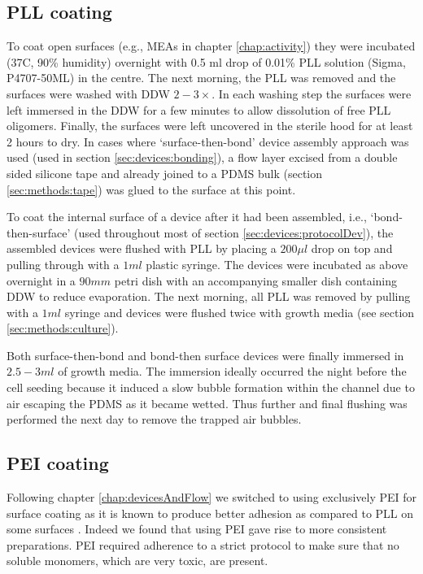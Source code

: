         \subsection{PLL coating}
        To coat open surfaces (e.g., MEAs in chapter \ref{chap:activity}) they were incubated (37\degree C, 90\% humidity) overnight with 0.5 ml drop of 0.01\% PLL solution (Sigma, P4707-50ML) in the centre. The next morning, the PLL was removed and the surfaces were washed with DDW \(2-3\times\). In each washing step the surfaces were left immersed in the DDW for a few minutes to allow dissolution of free PLL oligomers. Finally, the surfaces were left uncovered in the sterile hood for at least 2 hours to dry. In cases where `surface-then-bond' device assembly approach was used (used in section \ref{sec:devices:bonding}), a flow layer excised from a double sided silicone tape and already joined to a PDMS bulk (section \ref{sec:methods:tape}) was glued to the surface at this point.

        To coat the internal surface of a device after it had been assembled, i.e., `bond-then-surface' (used throughout most of section \ref{sec:devices:protocolDev}), the assembled devices were flushed with PLL by placing a \(200\mu l\) drop on top and pulling through with a \(1ml\) plastic syringe. The devices were incubated as above overnight in a \(90mm\) petri dish with an accompanying smaller dish containing DDW to reduce evaporation. The next morning, all PLL was removed by pulling with a \(1ml\) syringe and devices were flushed twice with growth media (see section \ref{sec:methods:culture}).

         Both surface-then-bond and bond-then surface devices were finally immersed in \(2.5-3 ml\) of growth media. The immersion ideally occurred the night before the cell seeding because it induced a slow bubble formation within the channel due to air escaping the PDMS as it became wetted. Thus further and final flushing was performed the next day to remove the trapped air bubbles.

        \subsection{PEI coating}
        Following chapter \ref{chap:devicesAndFlow} we switched to using exclusively PEI for surface coating as it is known to produce better adhesion as compared to PLL on some surfaces \cite{wiertz2010regulation}. Indeed we found that using PEI gave rise to more consistent preparations. PEI required adherence to a strict protocol to make sure that no soluble monomers, which are very toxic, are present.

